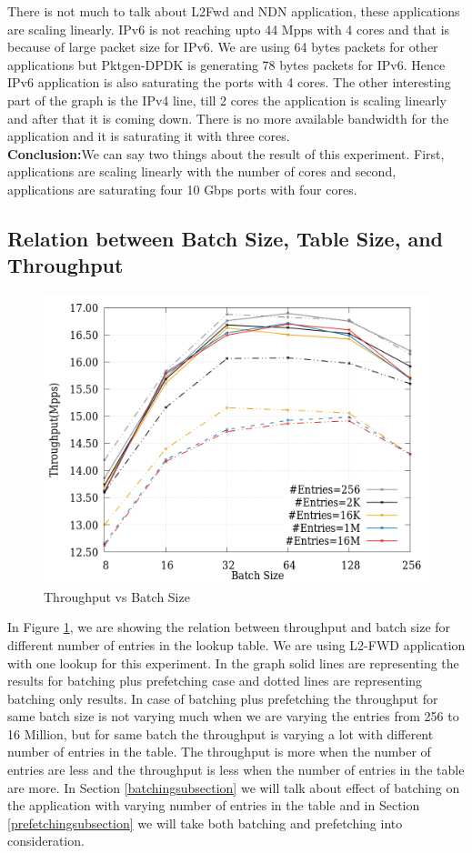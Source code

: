 There is not much to talk about L2Fwd and NDN application, these applications are scaling linearly. IPv6 is not reaching upto 44 Mpps with 4 cores and that is because of large packet size for IPv6. We are using 64 bytes packets for other applications but Pktgen-DPDK is generating 78 bytes packets for IPv6. Hence IPv6 application is also saturating the ports with 4 cores. The other interesting part of the graph is the IPv4 line, till 2 cores the application is scaling linearly and after that it is coming down. There is no more available bandwidth for the application and it is saturating it with three cores. 
\\
\textbf{Conclusion:}We can say two things about the result of this experiment. First, applications are scaling linearly with the number of cores and second, applications are saturating four 10 Gbps ports with four cores.

\subsection{Relation between Batch Size, Table Size, and Throughput}
\label{batchvstable}
\begin{figure}[ht]
\includegraphics[width = \linewidth]{Figures/TableSizeVsbatchSize.png}
\caption{Throughput vs Batch Size}
\label{tablesize}
\end{figure}
In Figure \ref{tablesize}, we are showing the relation between throughput and batch size for different number of entries in the lookup table. We are using L2-FWD application with one lookup for this experiment. In the graph solid lines are representing the results for batching plus prefetching case and dotted lines are representing batching only results. In case of batching plus prefetching the throughput for same batch size is not varying much when we are varying the entries from 256 to 16 Million, but for same batch the throughput is varying a lot with different number of entries in the table. The throughput is more when the number of entries are less and the throughput is less when the number of entries in the table are more. In Section \ref{batchingsubsection} we will talk about effect of batching on the application with varying number of entries in the table and in Section \ref{prefetchingsubsection} we will take both batching and prefetching into consideration.

